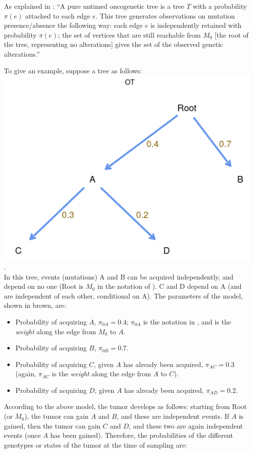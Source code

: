 \documentclass[a4paper,11pt]{article}
\begin{document}
As explained in \citep[Definition 1, p.~4]{Szabo2008}:  ``A pure untimed oncogenetic tree is a tree $T$ with a probability $\pi(e)$ attached to each edge $e$. This tree generates observations on mutation presence/absence the following way: each edge $e$ is independently retained with probability $\pi(e)$; the set of vertices that are still reachable from $M_0$ [the root of the tree, representing no alterations] gives the set of the observed genetic alterations.''


To give an example, suppose a tree as follows: \\

\includegraphics[width=.50\linewidth]{./dag_ot_ex1.png}.\\

In this tree, events (mutations) A and B can be acquired independently, and depend on no one (Root is $M_0$ in the notation of \citealp{Szabo2008}). C and D depend on A (and are independent of each other, conditional on A). The parameters of the model, shown in brown, are:
\begin{itemize}
\item Probability of acquiring $A$, $\pi_{0A} = 0.4$; $\pi_{0A}$ is the notation in \citealp{Szabo2008}, and is the \textit{weight} along the edge from $M_0$ to $A$.
\item Probability of acquiring $B$, $\pi_{0B} = 0.7$.
\item Probability of acquiring $C$, given $A$ has already been acquired, $\pi_{AC} = 0.3$ (again, $\pi_{AC}$ is the \textit{weight} along the edge from $A$ to $C$).
\item Probability of acquiring $D$, given $A$ has already been acquired, $\pi_{AD} = 0.2$. 
\end{itemize}


According to the above model, the tumor develops as follows: starting from Root (or $M_0$), the tumor can gain $A$ and $B$, and these are independent events. If $A$ is gained, then the tumor can gain $C$ and $D$, and these two are again independent events (once $A$ has been gained). Therefore, the probabilities of the different genotypes or states of the tumor at the time of sampling are:
\end{document}
